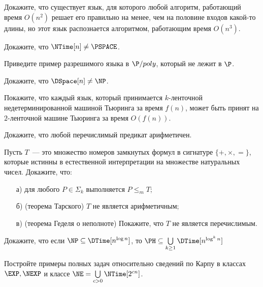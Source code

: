 

\begin{task}
	Докажите, что существует язык, для которого любой алгоритм, работающий время $O(n^2)$ решает его правильно на менее, чем на
    половине входов какой-то длины, но этот язык распознается алгоритмом, работающим время $O(n^3)$.
\end{task}

\begin{task}
	Докажите, что ${\NTime}[n] \neq \PSPACE$.
\end{task}

\begin{task}
	Приведите пример разрешимого языка в $\P/poly$, который не лежит в $\P$. 
\end{task}

\begin{task}
	Докажите, что $\DSpace[n] \neq \NP$.
\end{task}


\breakline

\begin{ptask}{8}
    Покажите, что каждый язык, который принимается $k$-ленточной недетерминированной машиной Тьюринга за время $f(n)$, может быть
    принят на $2$-ленточной машине Тьюринга за время $O(f(n))$.
\end{ptask}

\begin{ptask}{23}
	Докажите, что любой перечислимый предикат арифметичен. 
\end{ptask}


\begin{ptask}{30}
	Пусть $T$~--- это множество номеров замкнутых формул в сигнатуре $\{+, \times, {=\}}$, которые истинны в естественной
    интерпретации на множестве натуральных чисел. Докажите, что:
    \begin{enumerate}[topsep = 0pt, itemsep = -1ex]
        \item [а)] для любого $P \in \Sigma_k$ выполняется $P \le_m T$;
        \item [б)] (теорема Тарского) $T$ не является арифметичным;
        \item [в)] (теорема Геделя о неполноте) Покажите, что $T$ не является перечислимым.
    \end{enumerate}
\end{ptask}

\begin{ptask}{32}
	Докажите, что если $\NP \subseteq \DTime[n^{\log n}]$, то $\PH \subseteq \bigcup\limits_{k \ge 1} \DTime[n^{\log^k n}]$    
\end{ptask}


\begin{ptask}{35}
	Постройте примеры полных задач относительно сведений по Карпу в классах $\EXP, \NEXP$ и классе $\NE = \bigcup\limits_{c > 0}
    \NTime[2^{cn}]$.
\end{ptask}
